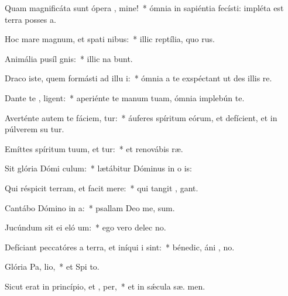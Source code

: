 \item Quam magnificáta sunt ópera , mine!~* ómnia in sapiéntia fecísti: impléta est terra posses a.
\item Hoc mare magnum, et spati nibus:~* illic reptília, quo   rus.
\item Animália pusíl  gnis:~* illic na bunt.
\item Draco iste, quem formásti ad illu i:~* ómnia a te exspéctant ut des illis   re.
\item Dante te , ligent:~* aperiénte te manum tuam, ómnia implebún te.
\item Averténte autem te fáciem, tur:~* áuferes spíritum eórum, et defícient, et in púlverem su tur.
\item Emíttes spíritum tuum, et tur:~* et renovábis  ræ.
\item Sit glória Dómi  culum:~* lætábitur Dóminus in o is:
\item Qui réspicit terram, et facit  mere:~* qui tangit ,  gant.
\item Cantábo Dómino in  a:~* psallam Deo me,  sum.
\item Jucúndum sit ei eló um:~* ego vero delec  no.
\item Defíciant peccatóres a terra, et iníqui i   sint:~* bénedic, áni , no.
\item Glória Pa,  lio,~* et Spi to.
\item Sicut erat in princípio, et ,  per,~* et in sǽcula sæ. men.
